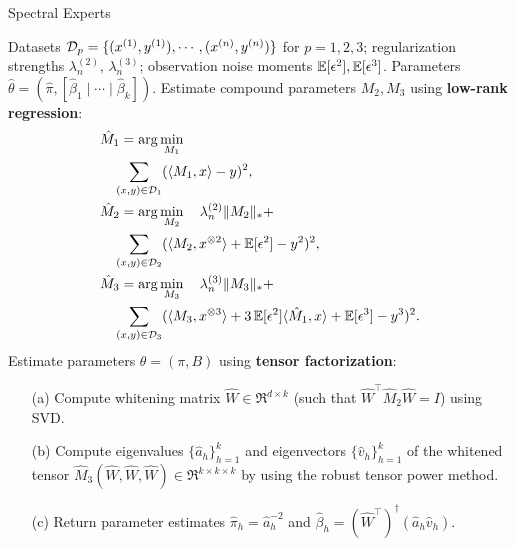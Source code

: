 \begin{algorithm}[t]
  \caption{Spectral Experts}
  \label{algo:spectral-experts}
  \begin{algorithmic}[1]
    \INPUT Datasets $\mathcal{D}_p = \{ (x^{(1)}, y^{(1)}), \cdots, (x^{(n)}, y^{(n)}) \}$ for $p = 1, 2, 3$;
    regularization strengths $\lambda_n^{(2)}$, $\lambda_n^{(3)}$;
    observation noise moments $\operatorname{\mathbb{E}}[\epsilon^2], \operatorname{\mathbb{E}}[\epsilon^3]$.
    \OUTPUT Parameters $\hat\theta = (\hat \pi, [\hat \beta_1 \mid \cdots \mid \hat \beta_k])$.
    \STATE Estimate compound parameters $M_2, M_3$ using \textbf{low-rank regression}:
    \begin{align}
      &\hat M_1 = \arg\min_{M_1} \label{eqn:estimateM1} \\
      &\quad\sum_{(x,y) \in \mathcal{D}_1} (\langle M_1, x \rangle - y)^2, \nonumber \\
      &\hat M_2 = \arg\min_{M_2} \quad \lambda_n^{(2)} \|M_2\|_* + \label{eqn:estimateM2} \\
      &\quad\sum_{(x,y) \in \mathcal{D}_2} (\langle M_2, x^{\otimes 2} \rangle + \operatorname{\mathbb{E}}[\epsilon^2] - y^2)^2, \nonumber \\
      &\hat M_3 = \arg\min_{M_3} \quad \lambda_n^{(3)} \|M_3\|_* + \label{eqn:estimateM3} \\
      &\quad\sum_{(x,y) \in \mathcal{D}_3} (\langle M_3, x^{\otimes 3} \rangle + 3 \operatorname{\mathbb{E}}[\epsilon^2]\langle \hat M_1, x \rangle + \operatorname{\mathbb{E}}[\epsilon^3] - y^3)^2. \nonumber
    \end{align}
    \STATE Estimate parameters $\theta = (\pi, B)$ using \textbf{tensor factorization}:
    \begin{enumerate}
      \item [(a)] Compute whitening matrix $\hat W \in \Re^{d \times k}$ (such that $\hat W^\top
      \hat M_2 \hat W = I$) using SVD.
      \item [(b)] Compute eigenvalues $\{\hat a_h\}_{h=1}^k$
      and eigenvectors $\{\hat v_h\}_{h=1}^k$
      of the whitened tensor $\hat M_3(\hat W, \hat W, \hat W) \in \Re^{k \times k \times k}$
      by using the robust tensor power method.
    \item [(c)] Return parameter estimates $\hat\pi_h = \hat a_h^{-2}$
    and $\hat\beta_h = (\hat W^{\top})^\dagger (\hat a_h \hat v_h)$.
    \end{enumerate}
  \end{algorithmic}
\end{algorithm}


